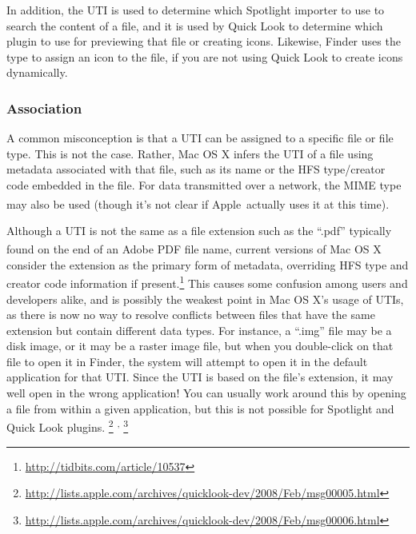 \documentclass[11pt]{article}
\providecommand{\xspace}{~}
\newcommand*{\apple}{Apple\textsuperscript{\textregistered}\xspace}
\begin{document}
In addition, the UTI is used to determine which Spotlight importer to use
to search the content of a file, and it is used by Quick Look to determine
which plugin to use for previewing that file or creating icons. Likewise,
Finder uses the type to assign an icon to the file, if you are not using
Quick Look to create icons dynamically.

\subsubsection{Association}
A common misconception is that a UTI can be assigned to a specific 
file or file type. This is not the case. Rather, Mac OS X infers the UTI of a file
using metadata associated with that file, such as its name or the HFS type/creator
code embedded in the file. 
For data transmitted over a network, the MIME type may also be used
(though it's not clear if \apple actually uses it at this time).

Although a UTI is not the same as a file extension such as the “.pdf” typically
found on the end of an Adobe\textsuperscript{\textregistered} PDF file name,
current versions of Mac OS X consider the extension as the primary
form of metadata, overriding HFS type and creator code information if
present.\footnote{\url{http://tidbits.com/article/10537}} This causes
some confusion among users and developers alike, and is possibly the weakest 
point in Mac OS X's usage of UTIs, as there is now no way to resolve 
conflicts between files that have the same extension
but contain different data types. For instance, a “.img” file may
be a disk image, or it may be a raster image file, but when you double-click on
that file to open it in Finder, the system will attempt to open it in the default
application for that UTI. Since the UTI is based on the file's extension,
it may well open in the wrong application! You can usually work around this
by opening a file from within a given application, but this is not possible for
Spotlight and Quick Look plugins.%
\footnote{\url{http://lists.apple.com/archives/quicklook-dev/2008/Feb/msg00005.html}}%
\textsuperscript{,}%
\footnote{\url{http://lists.apple.com/archives/quicklook-dev/2008/Feb/msg00006.html}}
\end{document}
